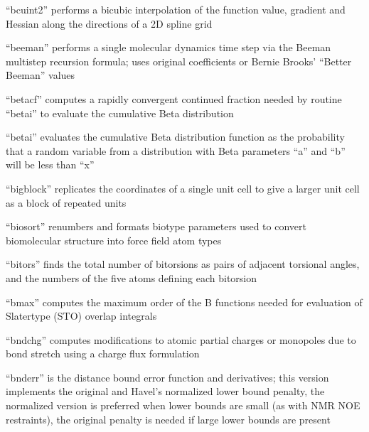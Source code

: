 \documentclass[letterpaper,11pt,english]{sphinxmanual}
\begin{document}

“bcuint2” performs a bicubic interpolation of the function value,
gradient and Hessian along the directions of a 2D spline grid


“beeman” performs a single molecular dynamics time step
via the Beeman multistep recursion formula; uses original
coefficients or Bernie Brooks’ “Better Beeman” values


“betacf” computes a rapidly convergent continued fraction needed
by routine “betai” to evaluate the cumulative Beta distribution


“betai” evaluates the cumulative Beta distribution function
as the probability that a random variable from a distribution
with Beta parameters “a” and “b” will be less than “x”


“bigblock” replicates the coordinates of a single unit cell
to give a larger unit cell as a block of repeated units


“biosort” renumbers and formats biotype parameters used to
convert biomolecular structure into force field atom types


“bitors” finds the total number of bitorsions as pairs
of adjacent torsional angles, and the numbers of the five
atoms defining each bitorsion


“bmax” computes the maximum order of the B functions needed
for evaluation of Slater\sphinxhyphen{}type (STO) overlap integrals


“bndchg” computes modifications to atomic partial charges or
monopoles due to bond stretch using a charge flux formulation


“bnderr” is the distance bound error function and derivatives;
this version implements the original and Havel’s normalized
lower bound penalty, the normalized version is preferred when
lower bounds are small (as with NMR NOE restraints), the
original penalty is needed if large lower bounds are present
\end{document}
